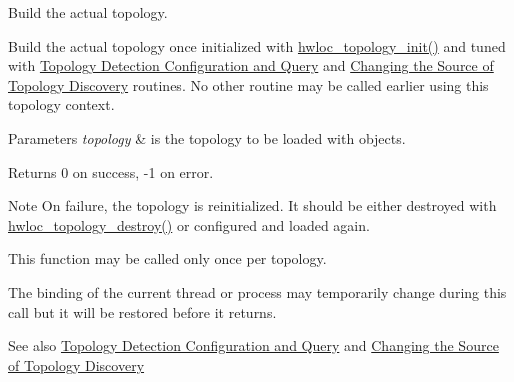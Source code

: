Build the actual topology. 

Build the actual topology once initialized with \hyperlink{a00186_ga03fd4a16d8b9ee1ffc32b25fd2f6bdfa}{hwloc\+\_\+topology\+\_\+init()} and tuned with \hyperlink{a00193}{Topology Detection Configuration and Query} and \hyperlink{a00192}{Changing the Source of Topology Discovery} routines. No other routine may be called earlier using this topology context.


\begin{DoxyParams}{Parameters}
{\em topology} & is the topology to be loaded with objects.\\
\hline
\end{DoxyParams}
\begin{DoxyReturn}{Returns}
0 on success, -\/1 on error.
\end{DoxyReturn}
\begin{DoxyNote}{Note}
On failure, the topology is reinitialized. It should be either destroyed with \hyperlink{a00186_ga9f34a640b6fd28d23699d4d084667b15}{hwloc\+\_\+topology\+\_\+destroy()} or configured and loaded again.

This function may be called only once per topology.

The binding of the current thread or process may temporarily change during this call but it will be restored before it returns.
\end{DoxyNote}
\begin{DoxySeeAlso}{See also}
\hyperlink{a00193}{Topology Detection Configuration and Query} and \hyperlink{a00192}{Changing the Source of Topology Discovery} 
\end{DoxySeeAlso}
